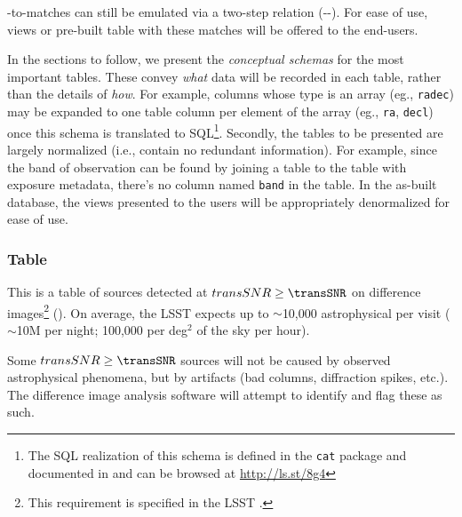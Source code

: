 \DIASource-to-\Object matches can still be emulated via a two-step relation (\DIASource-\DIAObject-\Object). For ease of use, views or pre-built table with these matches will be offered to the end-users.


In the sections to follow, we present the \emph{conceptual schemas} for the most important \PPDB tables. These convey \emph{what} data will be recorded in each table, rather than the details of \emph{how}. For example, columns whose type is an array (eg., \texttt{radec}) may be expanded to one table column per element of the array (eg., \texttt{ra}, \texttt{decl}) once this schema is translated to SQL\footnote{The SQL realization of this schema is defined in the \texttt{cat} package and documented in  and can be browsed at \url{http://ls.st/8g4}}. Secondly, the tables to be presented are largely normalized (i.e., contain no redundant information). For example, since the band of observation can be found by joining a \DIASource table to the table with exposure metadata, there's no column named \texttt{band} in the \DIASource table. In the as-built database, the views presented to the users will be appropriately denormalized for ease of use.

\subsubsection{\DIASource Table}

This is a table of sources detected at $transSNR \geq \transSNR$  on difference images\footnote{This requirement is specified in the LSST \SRD.} (\DIASources).
On average, the LSST \SRD expects
up to
$\sim$10,000 astrophysical \DIASources per visit ($\sim$10M per night; 100,000 per deg$^2$
of the sky per hour).

Some $transSNR \geq \transSNR$ sources will not be caused by observed astrophysical phenomena, but by artifacts (bad columns, diffraction spikes, etc.). The difference image analysis software will attempt to identify and flag these as such.


